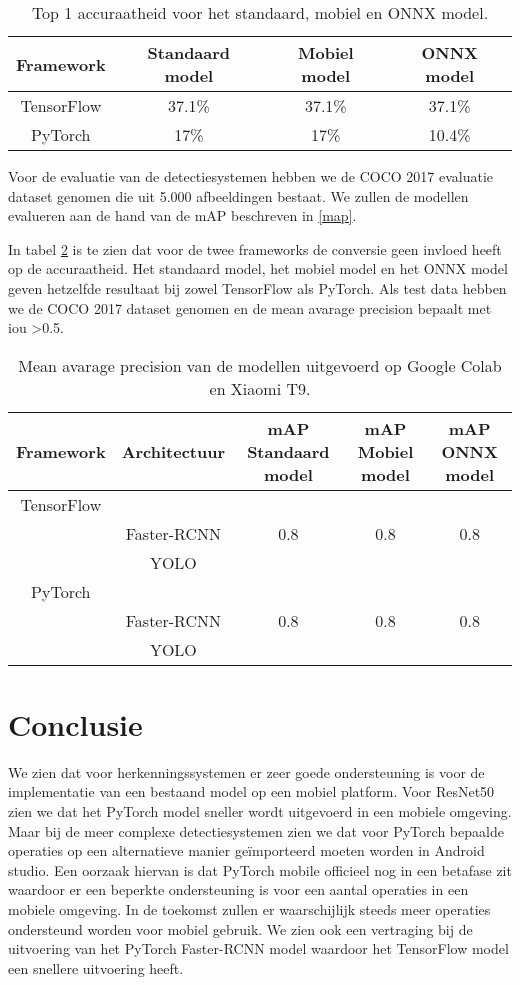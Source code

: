 \begin{table}[!ht]
    \caption{Top 1 accuraatheid voor het standaard, mobiel en ONNX model.}
\begin{tabular}{cccc}
    \hline
    Framework & Standaard model & Mobiel model & ONNX model \\
    \hline
    TensorFlow & 37.1\% & 37.1\% & 37.1\%  \\
    PyTorch & 17\% & 17\% & 10.4\%  \\
    \hline
\end{tabular}
\label{tab:class_acc}
\end{table}

Voor de evaluatie van de detectiesystemen hebben we de COCO 2017 evaluatie dataset genomen die uit 5.000 afbeeldingen bestaat.
We zullen de modellen evalueren aan de hand van de mAP beschreven in \ref{map}.

In tabel \ref{tab:rcnn_acc} is te zien dat voor de twee frameworks de conversie geen invloed heeft op de accuraatheid.
Het standaard model, het mobiel model en het ONNX model geven hetzelfde resultaat bij zowel TensorFlow als PyTorch.
Als test data hebben we de COCO 2017 dataset genomen en de mean avarage precision bepaalt met iou \textgreater 0.5.
\begin{table}[!ht]
    \caption{Mean avarage precision van de modellen uitgevoerd op Google Colab en Xiaomi T9.}
\begin{tabular}{ccccc}
    \hline
    Framework & Architectuur & mAP Standaard model & mAP Mobiel model & mAP ONNX model\\
    \hline
    TensorFlow & & & & \\
     & Faster-RCNN & 0.8 & 0.8 & 0.8 \\
     & YOLO & & & \\
    PyTorch & & & & \\
     & Faster-RCNN & 0.8 & 0.8 & 0.8 \\
     & YOLO & & & \\
    \hline
\end{tabular}
\label{tab:rcnn_acc}
\end{table}

\section{Conclusie}
We zien dat voor herkenningssystemen er zeer goede ondersteuning is voor de implementatie van een bestaand model op een mobiel platform.
Voor ResNet50 zien we dat het PyTorch model sneller wordt uitgevoerd in een mobiele omgeving.
Maar bij de meer complexe detectiesystemen zien we dat voor PyTorch bepaalde operaties op een alternatieve manier ge\"importeerd moeten worden in Android studio.
Een oorzaak hiervan is dat PyTorch mobile officieel nog in een betafase zit waardoor er een beperkte ondersteuning is voor een aantal operaties in een mobiele omgeving.
In de toekomst zullen er waarschijlijk steeds meer operaties ondersteund worden voor mobiel gebruik.
We zien ook een vertraging bij de uitvoering van het PyTorch Faster-RCNN model waardoor het TensorFlow model een snellere uitvoering heeft.

